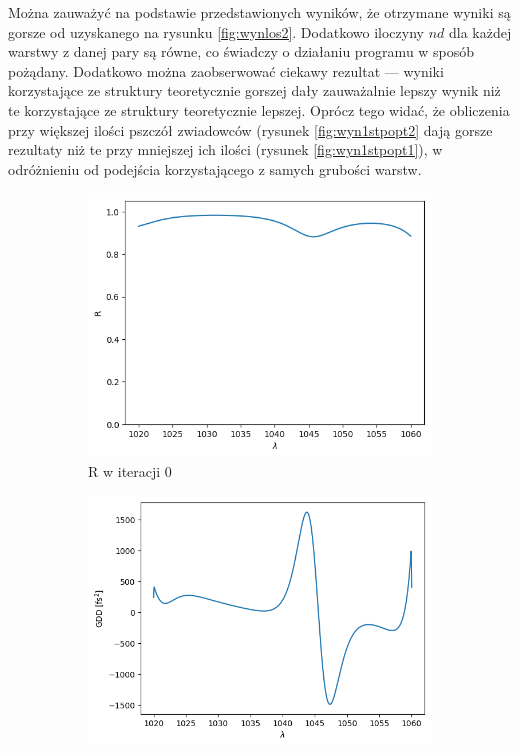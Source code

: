 Można zauważyć na podstawie przedstawionych wyników, że otrzymane wyniki są gorsze od uzyskanego na rysunku \ref{fig:wynlos2}. Dodatkowo iloczyny $nd$ dla każdej warstwy z danej pary są równe, co świadczy o działaniu programu w sposób pożądany. Dodatkowo można zaobserwować ciekawy rezultat --- wyniki korzystające ze struktury teoretycznie gorszej dały zauważalnie lepszy wynik niż te korzystające ze struktury teoretycznie lepszej. Oprócz tego widać, że obliczenia przy większej ilości pszczół zwiadowców (rysunek \ref{fig:wyn1stpopt2} dają gorsze rezultaty niż te przy mniejszej ich ilości (rysunek \ref{fig:wyn1stpopt1}), w odróżnieniu od podejścia korzystającego z samych grubości warstw.

\begin{figure} [H]
    \centering
    \begin{subfigure}[b]{0.30\textwidth}
        \includegraphics[width=\linewidth]{figures/wyniki/1stopien/opt1000/result_Rresult0.png}
        \caption{R w iteracji 0}
    \end{subfigure}
            \begin{subfigure}[b]{0.31\textwidth}
        \includegraphics[width=\linewidth]{figures/wyniki/1stopien/opt1000/result_gddresult0.png}

\end{subfigure}
\end{figure}
